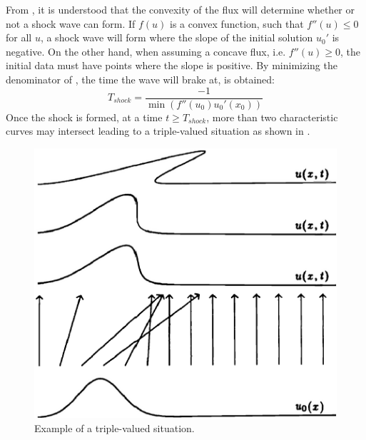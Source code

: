 From , it is understood that the convexity of the flux will determine whether or not a shock wave can form. If $f(u)$ is a convex function, such that $f''(u) \leq 0$ for all $u$, a shock wave will form where the slope of the initial solution $u_0'$ is negative. On the other hand, when assuming a concave flux, i.e. $f''(u) \geq 0$, the initial data must have points where the slope is positive. By minimizing the denominator of , the time the wave will brake at, is obtained: 
%
\begin{equation}
T_{shock} = \frac{-1}{\min\left( {f''(u_0) u_0'(x_0)} \right)} 
\end{equation}
% 
Once the shock is formed, at a time $t \geq T_{shock}$, more than two characteristic curves may intersect leading to a triple-valued situation as shown in . 
%
\begin{figure}[H]
\centering
\includegraphics[width=\textwidth]{figures/charact_curves_burger.png}
\caption{Example of a triple-valued situation.}
\label{fig:triple_pt_bg_sct1b}
\end{figure}
